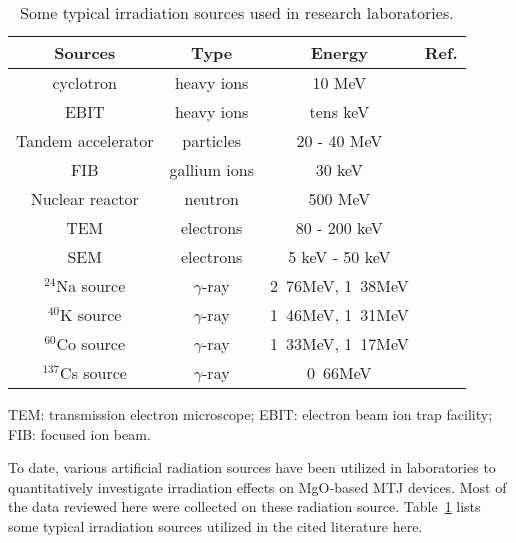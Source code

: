 \documentclass[molecules,review,submit,pdftex,moreauthors]{Definitions/mdpi}
\begin{document}
\begin{table}
\caption{Some typical irradiation sources used in research laboratories.} 
\centering
\begin{tabular}{cccc} %
\toprule 
 Sources & Type & Energy & Ref.\\
\midrule
cyclotron & heavy ions & 10 MeV & \cite{Elghefari2008Report,Zhao2019AS} \\
EBIT & heavy ions & tens keV & \cite{Pomeroy2007NIMPRSb,Zhao2019AS} \\ 
Tandem accelerator & particles & 20 - 40 MeV & \cite{Kobayashi2014IEEE,Zhao2019AS} \\
FIB & gallium ions & 30 keV & \cite{Zhao2019AS}\\
\midrule
Nuclear reactor & neutron & 500 MeV & \cite{Cost1988IEEE} \\
\midrule
TEM & electrons & 80 - 200 keV & \cite{Liu2018AM} \\
SEM & electrons & 5 keV - 50 keV & \cite{Zhao2019AS} \\
\midrule
 $^{24}$Na source & $\gamma$-ray & \unit{2.76}{MeV}, \unit{1.38}{MeV} & \added{\cite{Beach1953PR,Shkapa1993JNCS}} \\
 $^{40}$K  source & $\gamma$-ray & \unit{1.46}{MeV}, \unit{1.31}{MeV} & \\
 $^{60}$Co source & $\gamma$-ray & \unit{1.33}{MeV}, \unit{1.17}{MeV} & \added{\cite{Hughes2012IEEE,Wang2019IEEE}} \\
 $^{137}$Cs source & $\gamma$-ray & \unit{0.66}{MeV} & \added{\cite{Arshak2005Conference}}\\
\bottomrule
\end{tabular}

{\footnotesize TEM: transmission electron microscope; EBIT: electron beam ion trap facility; FIB: focused ion beam.}

\label{Tab:LabIrradiationSource}
\end{table}


To date, various artificial radiation sources have been utilized in laboratories to quantitatively investigate irradiation effects on MgO-based MTJ devices.  Most of the data reviewed here were collected on these radiation source.   Table~\ref{Tab:LabIrradiationSource} lists some typical irradiation sources utilized in the cited literature here. 
\end{document}
